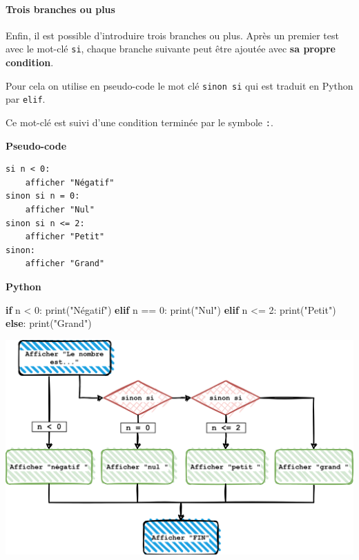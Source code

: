 \documentclass[a4paper,17pt]{extarticle}
\let\origfigure\figure
\let\endorigfigure\endfigure
\renewenvironment{figure}[1][2] {
    \expandafter\origfigure\expandafter[H]
} {
    \endorigfigure
}
\newenvironment{Shaded}{}{}
\newcommand{\DecValTok}[1]{\textcolor[rgb]{0.25,0.63,0.44}{{#1}}}
\newcommand{\StringTok}[1]{\textcolor[rgb]{0.25,0.44,0.63}{{#1}}}
\newcommand{\NormalTok}[1]{{#1}}
\newcommand{\ControlFlowTok}[1]{\textcolor[rgb]{0.00,0.44,0.13}{\textbf{{#1}}}}
\newcommand{\OperatorTok}[1]{\textcolor[rgb]{0.40,0.40,0.40}{{#1}}}
\newcommand{\BuiltInTok}[1]{{#1}}
\begin{document}
    \hypertarget{trois-branches-ou-plus}{%
\paragraph{Trois branches ou plus}\label{trois-branches-ou-plus}}

    Enfin, il est possible d'introduire trois branches ou plus. Après un
premier test avec le mot-clé \texttt{si}, chaque branche suivante peut
être ajoutée avec \textbf{sa propre condition}.

Pour cela on utilise en pseudo-code le mot clé \texttt{sinon\ si} qui
est traduit en Python par \texttt{elif}.

Ce mot-clé est suivi d'une condition terminée par le symbole \texttt{:}.
\begin{exemple}
    \textbf{Pseudo-code}

\begin{verbatim}
si n < 0:
    afficher "Négatif"
sinon si n = 0:
    afficher "Nul"
sinon si n <= 2:
    afficher "Petit"
sinon:
    afficher "Grand"
\end{verbatim}

\textbf{Python}

\begin{Shaded}
\begin{Highlighting}[]
\ControlFlowTok{if}\NormalTok{ n }\OperatorTok{\textless{}} \DecValTok{0}\NormalTok{:}
    \BuiltInTok{print}\NormalTok{(}\StringTok{"Négatif"}\NormalTok{)}
\ControlFlowTok{elif}\NormalTok{ n }\OperatorTok{==} \DecValTok{0}\NormalTok{:}
    \BuiltInTok{print}\NormalTok{(}\StringTok{"Nul"}\NormalTok{)}
\ControlFlowTok{elif}\NormalTok{ n }\OperatorTok{\textless{}=} \DecValTok{2}\NormalTok{:}
    \BuiltInTok{print}\NormalTok{(}\StringTok{"Petit"}\NormalTok{)}
\ControlFlowTok{else}\NormalTok{:}
    \BuiltInTok{print}\NormalTok{(}\StringTok{"Grand"}\NormalTok{)}
\end{Highlighting}
\end{Shaded}

        \end{exemple}
    \begin{figure}
\centering
\includegraphics{./res/branche01.png}
\caption{Diagramme}
\end{figure}
\end{document}
